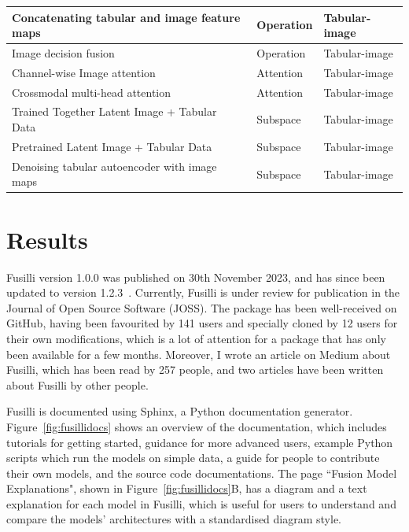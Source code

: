 \begin{table}[!ht]
\begin{tabular}{|p{8cm}ll|}
        Concatenating tabular and image feature maps~\cite{gaoReducingUncertaintyCancer2022} & Operation & Tabular-image \\ \hline
        Image decision fusion & Operation & Tabular-image \\ \hline 
        Channel-wise Image attention~\cite{duanmuPredictionPathologicalComplete2020} & Attention & Tabular-image \\ \hline
        Crossmodal multi-head attention~\cite{golovanevskyMultimodalAttentionbasedDeep2022} & Attention & Tabular-image \\ \hline
        Trained Together Latent Image + Tabular Data~\cite{zhaoMultimodalDeepLearning2022} & Subspace & Tabular-image \\ \hline
        Pretrained Latent Image + Tabular Data~\cite{zhaoMultimodalDeepLearning2022} & Subspace & Tabular-image \\ \hline
        Denoising tabular autoencoder with image maps~\cite{yanRicherFusionNetwork2021} & Subspace & Tabular-image \\ \hline
    \end{tabular}
\end{table}

\section{Results}

Fusilli version 1.0.0 was published on 30th November 2023, and has since been updated to version 1.2.3~\cite{townendFlorencejtFusilliFusilli2024}.
Currently, Fusilli is under review for publication in the Journal of Open Source Software (JOSS).
The package has been well-received on GitHub, having been favourited by 141 users and specially cloned by 12 users for their own modifications, which is a lot of attention for a package that has only been available for a few months.
Moreover, I wrote an article on Medium about Fusilli, which has been read by 257 people, and two articles have been written about Fusilli by other people.

Fusilli is documented using Sphinx, a Python documentation generator.
Figure~\ref{fig:fusillidocs} shows an overview of the documentation, which includes tutorials for getting started, guidance for more advanced users, example Python scripts which run the models on simple data, a guide for people to contribute their own models, and the source code documentations.
The page ``Fusion Model Explanations", shown in Figure~\ref{fig:fusillidocs}B, has a diagram and a text explanation for each model in Fusilli, which is useful for users to understand and compare the models' architectures with a standardised diagram style.

